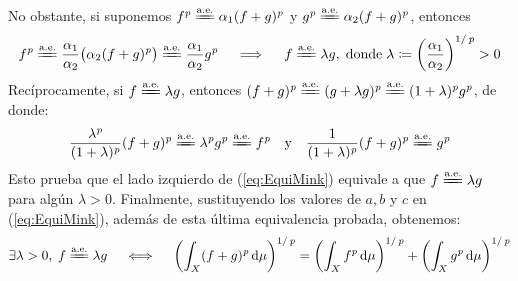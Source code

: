 \begin{sol}
\begin{enumerate}[label = (\roman*), leftmargin=1.5em]
No obstante, si suponemos $f^{\p} \ctpeq \alpha_1(f+g)^{\p}$ y $g^{\p} \ctpeq \alpha_2(f+g)^{\p}$, entonces 
\[
f^{\p} \ctpeq \frac{\alpha_1}{\alpha_2}\big(\alpha_2(f+g)^{\p}\big) \ctpeq \frac{\alpha_1}{\alpha_2}g^{\p}
\quad\implies\quad
f \ctpeq \lambda g, \;\text{donde}\; \lambda \coloneq \bigg(\frac{\alpha_1}{\alpha_2}\bigg)^{1/\p} >0
\]
Recíprocamente, si $f \ctpeq \lambda g$, entonces $(f+g)^{\p} \ctpeq (g+\lambda g)^{\p} \ctpeq (1+\lambda)^{\p}g^{\p}$, de donde:
\[
\frac{\lambda^{\p}}{(1+\lambda)^{\p}}(f+g)^{\p} \ctpeq \lambda^{\p}g^{\p}\ctpeq f^{\p}
\quad\text{y}\quad
\frac{1}{(1+\lambda)^{\p}}(f+g)^{\p} \ctpeq g^{\p}
\]
Esto prueba que el lado izquierdo de (\ref{eq:EquiMink}) equivale a que $f \ctpeq \lambda g$ para algún $\lambda > 0$. Finalmente, sustituyendo los valores de $a,b$ y $c$ en (\ref{eq:EquiMink}), además de esta última equivalencia probada, obtenemos:
\[
\exists \lambda>0,\; f \ctpeq \lambda g
\quad\iff\quad
\left(\int_X (f+g)^{\p} \dd{\mu}\right)^{1/\p}  =  \left(\int_X f^{\p} \dd{\mu}\right)^{1/\p} + \left(\int_X g^{\p} \dd{\mu}\right)^{1/\p}
\]
\end{enumerate}
\end{sol}